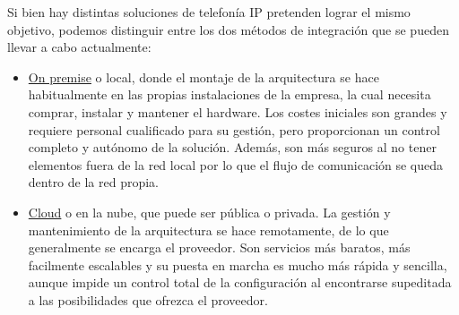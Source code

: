\documentclass[a4paper, 12pt]{book}
\begin{document}
Si bien hay distintas soluciones de telefonía IP pretenden lograr el mismo objetivo, podemos distinguir entre los dos métodos de integración que se pueden llevar a cabo actualmente:
\begin{itemize}
  \renewcommand{\theenumi}{\alph{enumi}}
  \item \underline{On premise} o local, donde el montaje de la arquitectura se hace habitualmente en las propias instalaciones de la empresa, la cual necesita comprar, instalar y mantener el hardware. Los costes iniciales son grandes y requiere personal cualificado para su gestión, pero proporcionan un control completo y autónomo de la solución. Además, son más seguros al no tener elementos fuera de la red local por lo que el flujo de comunicación se queda dentro de la red propia.  

  \item \underline{Cloud} o en la nube, que puede ser pública o privada. La gestión y mantenimiento de la arquitectura se hace remotamente, de lo que generalmente se encarga el proveedor. Son servicios más baratos, más facilmente escalables y su puesta en marcha es mucho más rápida y sencilla, aunque impide un control total de la configuración al encontrarse supeditada a las posibilidades que ofrezca el proveedor.
\end{itemize}
\end{document}
